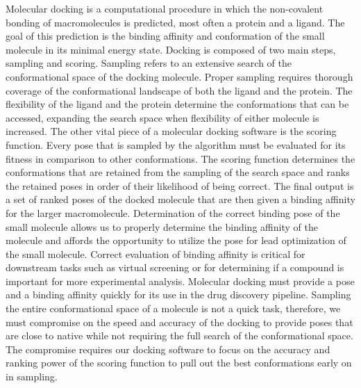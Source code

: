 \documentclass[journal=jcisd8,manuscript=article]{achemso}
\begin{document}
Molecular docking is a computational procedure in which the non-covalent bonding of macromolecules is predicted, most often a protein and a ligand. The goal of this prediction is the binding affinity and conformation of the small molecule in its minimal energy state. Docking is composed of two main steps, sampling and scoring. Sampling refers to an extensive search of the conformational space of the docking molecule. Proper sampling requires thorough coverage of the conformational landscape of both the ligand and the protein. The flexibility of the ligand and the protein determine the conformations that can be accessed, expanding the search space when flexibility of either molecule is increased. The other vital piece of a molecular docking software is the scoring function. Every pose that is sampled by the algorithm must be evaluated for its fitness in comparison to other conformations. The scoring function determines the conformations that are retained from the sampling of the search space and ranks the retained poses in order of their likelihood of being correct. The final output is a set of ranked poses of the docked molecule that are then given a binding affinity for the larger macromolecule. Determination of the correct binding pose of the small molecule allows us to properly determine the binding affinity of the molecule and affords the opportunity to utilize the pose for lead optimization of the small molecule. Correct evaluation of binding affinity is critical for downstream tasks such as virtual screening or for determining if a compound is important for more experimental analysis. Molecular docking must provide a pose and a binding affinity quickly for its use in the drug discovery pipeline. Sampling the entire conformational space of a molecule is not a quick task, therefore, we must compromise on the speed and accuracy of the docking to provide poses that are close to native while not requiring the full search of the conformational space. The compromise requires our docking software to focus on the accuracy and ranking power of the scoring function to pull out the best conformations early on in sampling.
\end{document}
